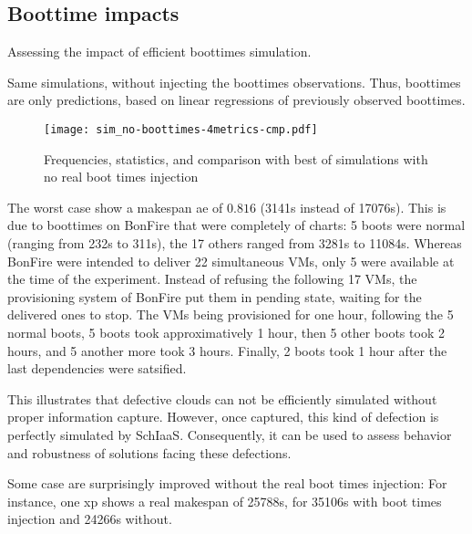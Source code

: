 \documentclass[a4paper,10pt]{article}
\newcommand\vrpath{../../lab/setup/simschlouder/validation-results/}
\begin{document}
\subsection{Boottime impacts}

Assessing the impact of efficient boottimes simulation.

Same simulations, without injecting the boottimes observations. 
Thus, boottimes are only predictions, based on linear regressions of previously
observed boottimes.

\begin{figure}
  \centering
  \texttt{[image: sim\_no-boottimes-4metrics-cmp.pdf]}

  

  

  

  \caption{Frequencies, statistics, and comparison with best of simulations with no real boot times 
  injection}

\end{figure} 

The worst case show a makespan ae of $0.816$ (3141s instead of 17076s). 
This is due to boottimes on BonFire that were completely of charts: 
5 boots were normal (ranging from 232s to 311s), 
the 17 others ranged from 3281s to 11084s.
Whereas BonFire were intended to deliver 22 simultaneous VMs, only 5 were available
at the time of the experiment. Instead of refusing the following 17 VMs, the
provisioning system of BonFire put them in pending state, waiting for the delivered
ones to stop. The VMs being provisioned for one hour, following the 5 normal boots, 
5 boots took approximatively 1 hour, then 5 other boots took 2 hours,
and 5 another more took 3 hours. Finally, 2 boots took 1 hour after the last 
dependencies were satsified.

This illustrates that defective clouds can not be efficiently simulated without 
proper information capture. However, once captured, this kind of defection is
perfectly simulated by SchIaaS. Consequently, it can be used to assess behavior 
and robustness of solutions facing these defections.

Some case are surprisingly improved without the real boot times injection:
For instance, one xp shows a real makespan of 25788s, for 35106s with boot times
injection and 24266s without. 
\end{document}
